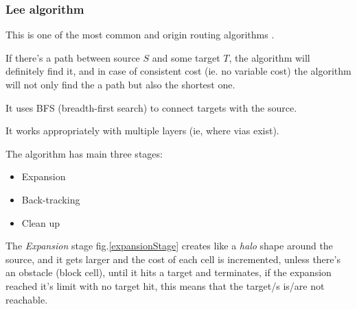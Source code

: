     \subsubsection{Lee algorithm}
    \label{LeeSection}
    This is one of the most common and origin routing algorithms \cite{LeeRef}.

    If there's a path between source $S$ and some target $T$, the algorithm will definitely find it,
    and in case of consistent cost (ie. no variable cost) the algorithm will not only find the 
    a path but also the shortest one.

    It uses BFS (breadth-first search) to connect targets with the source.

    It works appropriately with multiple layers (ie, where vias exist).

    The algorithm has main three stages:
    \begin{itemize}
        \item Expansion
        \item Back-tracking
        \item Clean up
    \end{itemize}

    The \textit{Expansion} stage fig.\ref{expansionStage} creates like a \textit{halo} shape around the source,
    and it gets larger and the cost of each cell is incremented,
    unless there's an obstacle (block cell),
    until it hits a target and terminates,
    if the expansion reached it's limit with no target hit, this means that the target/s is/are not
    reachable.

